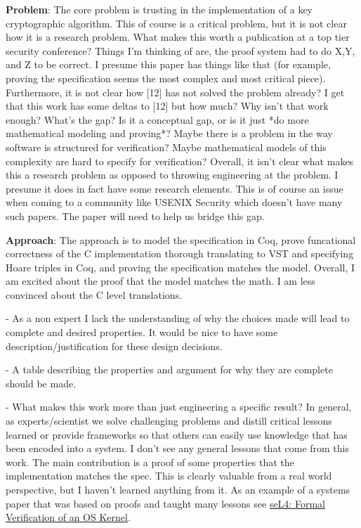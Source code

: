 \textbf{Problem}: The core problem is trusting in the implementation of a key cryptographic algorithm. This of course is a critical problem, but it is not clear how it is a research problem. What makes this worth a publication at a top tier security conference? Things I’m thinking of are, the proof system had to do X,Y, and Z to be correct. I presume this paper has things like that (for example, proving the specification seems the most complex and most critical piece). Furthermore, it is not clear how [12] has not solved the problem already? I get that this work has some deltas to [12] but how much? Why isn’t that work enough? What’s the gap? Is it a conceptual gap, or is it just *do more mathematical modeling and proving*? Maybe there is a problem in the way software is structured for verification? Maybe mathematical models of this complexity are hard to specify for verification? Overall, it isn’t clear what makes this a research problem as opposed to throwing engineering at the problem. I presume it does in fact have some research elements. This is of course an issue when coming to a community like USENIX Security which doesn’t have many such papers. The paper will need to help us bridge this gap.

\textbf{Approach}: The approach is to model the specification in Coq, prove funcational correctness of the C implementation thorough translating to VST and specifying Hoare triples in Coq, and proving the specification matches the model. Overall, I am excited about the proof that the model matches the math. I am less convinced about the C level translations.

- As a non expert I lack the understanding of why the choices made will lead to complete and desired properties. It would be nice to have some description/justification for these design decisions.

- A table describing the properties and argument for why they are complete should be made.

- What makes this work more than just engineering a specific result? In general, as experts/scientist we solve challenging problems and distill critical lessons learned or provide frameworks so that others can easily use knowledge that has been encoded into a system. I don’t see any general lessons that come from this work. The main contribution is a proof of some properties that the implementation matches the spec. This is clearly valuable from a real world perspective, but I haven’t learned anything from it. As an example of a systems paper that was based on proofs and taught many lessons see \href{https://www.sigops.org/s/conferences/sosp/2009/papers/klein-sosp09.pdf}{seL4: Formal Verification of an OS Kernel}.

